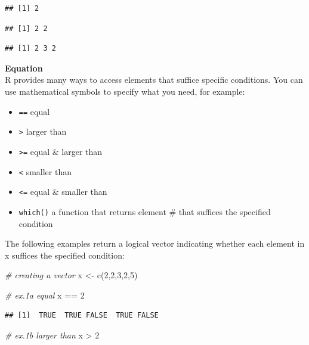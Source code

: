 \documentclass[
]{book}
\newenvironment{Shaded}{\begin{snugshade}}{\end{snugshade}}
\newcommand{\CommentTok}[1]{\textcolor[rgb]{0.56,0.35,0.01}{\textit{#1}}}
\newcommand{\DecValTok}[1]{\textcolor[rgb]{0.00,0.00,0.81}{#1}}
\newcommand{\FunctionTok}[1]{\textcolor[rgb]{0.00,0.00,0.00}{#1}}
\newcommand{\NormalTok}[1]{#1}
\newcommand{\OtherTok}[1]{\textcolor[rgb]{0.56,0.35,0.01}{#1}}
\newcommand{\SpecialCharTok}[1]{\textcolor[rgb]{0.00,0.00,0.00}{#1}}
\providecommand{\tightlist}{%
  \setlength{\itemsep}{0pt}\setlength{\parskip}{0pt}}
\begin{document}
\begin{verbatim}
## [1] 2
\end{verbatim}

\begin{verbatim}
## [1] 2 2
\end{verbatim}

\begin{verbatim}
## [1] 2 3 2
\end{verbatim}

\textbf{Equation}\\
R provides many ways to access elements that suffice specific conditions. You can use mathematical symbols to specify what you need, for example:

\begin{itemize}
\tightlist
\item
  \texttt{==} equal
\item
  \texttt{\textgreater{}} larger than
\item
  \texttt{\textgreater{}=} equal \& larger than
\item
  \texttt{\textless{}} smaller than
\item
  \texttt{\textless{}=} equal \& smaller than
\item
  \texttt{which()} a function that returns element \# that suffices the specified condition
\end{itemize}

The following examples return a logical vector indicating whether each element in x suffices the specified condition:

\begin{Shaded}
\begin{Highlighting}[]
\CommentTok{\# creating a vector}
\NormalTok{x }\OtherTok{\textless{}{-}} \FunctionTok{c}\NormalTok{(}\DecValTok{2}\NormalTok{,}\DecValTok{2}\NormalTok{,}\DecValTok{3}\NormalTok{,}\DecValTok{2}\NormalTok{,}\DecValTok{5}\NormalTok{)}

\CommentTok{\# ex.1a equal}
\NormalTok{x }\SpecialCharTok{==} \DecValTok{2}
\end{Highlighting}
\end{Shaded}

\begin{verbatim}
## [1]  TRUE  TRUE FALSE  TRUE FALSE
\end{verbatim}

\begin{Shaded}
\begin{Highlighting}[]
\CommentTok{\# ex.1b larger than}
\NormalTok{x }\SpecialCharTok{\textgreater{}} \DecValTok{2} 
\end{Highlighting}
\end{Shaded}
\end{document}
